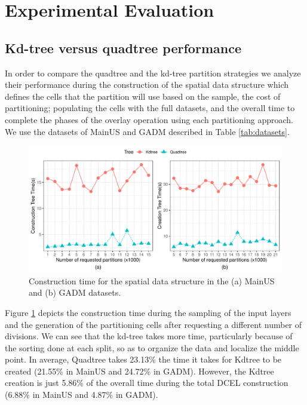 \section{Experimental Evaluation} \label{sec:extension_experiments}

\subsection{Kd-tree versus quadtree performance} \label{sec:comparison}
In order to compare the quadtree and the kd-tree partition strategies we analyze their performance during the construction of the spatial data structure which defines the cells that the partition will use based on the sample, the cost of partitioning; populating the cells with the full datasets, and the overall time to complete the phases of the overlay operation using each partitioning approach.  We use the datasets of MainUS and GADM described in Table \ref{tab:datasets}.

 \begin{figure}
    \centering
    \includegraphics[width=\textwidth]{chapterExtension/K/K_Creation}
    \caption{Construction time for the spatial data structure in the (a) MainUS and (b) GADM datasets.}\label{fig:k_creation_us}
 \end{figure}

Figure \ref{fig:k_creation_us} depicts the construction time during the sampling of the input layers and the generation of the partitioning cells after requesting a different number of divisions. We can see that the kd-tree takes more time, particularly because of the sorting done at each split, so as to organize the data and localize the middle point. In average, Quadtree takes 23.13\% the time it takes for Kdtree to be created (21.55\% in MainUS and 24.72\% in GADM). However, the Kdtree creation is just 5.86\% of the overall time during the total DCEL construction (6.88\% in MainUS and 4.87\% in GADM).

